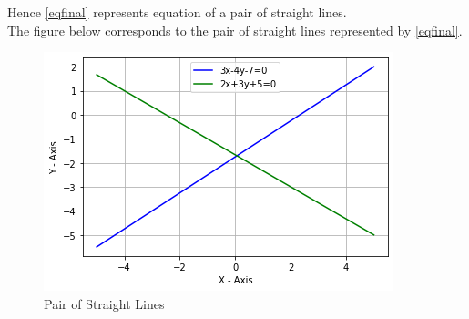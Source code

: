 \documentclass[journal,12pt,twocolumn]{IEEEtran}
\begin{document}
Hence \eqref{eqfinal} represents equation of a pair of straight lines.\\
The figure below corresponds to the pair of straight lines represented by \eqref{eqfinal}.
\renewcommand{\thefigure}{1}
\begin{figure}[h!]
\centering
\includegraphics[width = \columnwidth]{Lines.png}
\caption{Pair of Straight Lines}
\label{fig:my_label}
\end{figure}
\end{document}
